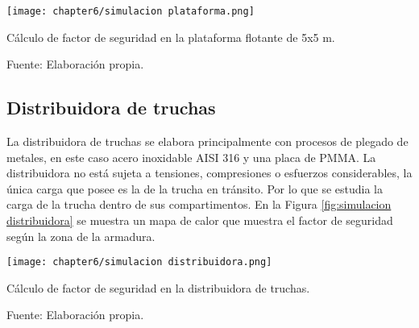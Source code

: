 \begin{myfigure}[H]
	\footnotesize\centering
	\texttt{[image: chapter6/simulacion plataforma.png]}
	\caption{Cálculo de factor de seguridad en la plataforma flotante de 5x5 m.}
	\begin{myflushcenter}
		Fuente: Elaboración propia.
	\end{myflushcenter}
	\label{fig:simulacion plataforma}
\end{myfigure}


\subsection{Distribuidora de truchas}

La distribuidora de truchas se elabora principalmente con procesos de plegado de metales, en este caso acero inoxidable AISI 316 y una placa de PMMA. La distribuidora no está sujeta a tensiones, compresiones o esfuerzos considerables, la única carga que posee es la de la trucha en tránsito. Por lo que se estudia la carga de la trucha dentro de sus compartimentos. En la Figura \ref{fig:simulacion distribuidora} se muestra un mapa de calor que muestra el factor de seguridad según la zona de la armadura.

\begin{myfigure}[H]
	\footnotesize\centering
	\texttt{[image: chapter6/simulacion distribuidora.png]}
	\caption{Cálculo de factor de seguridad en la distribuidora de truchas.}
	\begin{myflushcenter}
		Fuente: Elaboración propia.
	\end{myflushcenter}
	\label{fig:simulacion distribuidora}
\end{myfigure}



